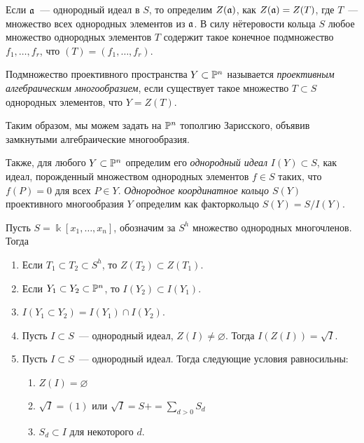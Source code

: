  	Если $\mathfrak{a}$~--- однородный идеал в $S$, то определим $Z(\mathfrak{a})$, как $Z(\mathfrak{a}) = Z(T)$, где $T$~--- множество всех однородных элементов из $\mathfrak{a}$. В силу нётеровости кольца $S$ любое множество однородных элементов $T$ содержит такое конечное подмножество $f_1, \ldots, f_r$, что $(T) = (f_1, \ldots, f_r)$.


 	\begin{definition} 
 		Подмножество проективного пространства $Y \subset \mathbb{P}^n$ называется \emph{проективным алгебраическим многообразием}, если существует такое множество $T \subset S$ однородных элементов, что $Y = Z(T)$.
 	\end{definition}

 	Таким образом, мы можем задать на $\mathbb{P}^n$ тополгию Зарисского, объявив замкнутыми алгебраические многообразия. 

 	\begin{definition} 
 		Также, для любого $Y \subset \mathbb{P}^n$ определим его \emph{однородный идеал} $I(Y) \subset S$, как идеал, порожденный множеством однородных элементов $f \in S$ таких, что $f(P) = 0$ для всех $P \in Y$. \emph{Однородное координатное кольцо $S(Y)$} проективного многообразия $Y$ определим как факторкольцо $S(Y) = S/I(Y)$. 	
 	\end{definition}
 	

 	\begin{exercise}
 		Пусть $S = \Bbbk[x_1, \ldots, x_n]$, обозначим за $S^h$ множество однородных многочленов. Тогда 
 		\begin{enumerate}
		 	\item Если $T_1 \subset T_2 \subset S^h$, то $Z(T_2) \subset Z(T_1)$.

		 	\item Если $Y_1 \subset Y_2 \subset \mathbb{P}^n$, то $I(Y_2) \subset I(Y_1)$.

		 	\item $I(Y_1 \subset Y_2) = I(Y_1) \cap I(Y_2)$.

		 	\item Пусть $I \subset S$~--- однородный идеал, $Z(I) \neq \varnothing$. Тогда $I(Z(I)) = \sqrt{I}$. 

		 	\item Пусть $I \subset S$~--- однородный идеал. Тогда следующие условия равносильны: 
		 	\begin{enumerate}
		 		\item $Z(I) = \varnothing$

		 		\item $\sqrt{I} = (1)$ или $\sqrt{I} = S+ = \sum_{d > 0} S_d$

		 		\item $S_d \subset I$ для некоторого $d$. 
		 	\end{enumerate}
		 \end{enumerate}		 
	\end{exercise}



